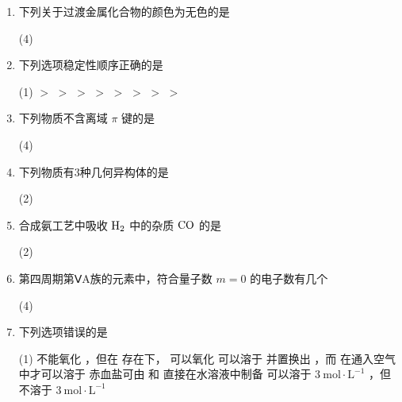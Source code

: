 \begin{enumerate}[label=\arabic*., itemsep=1.5ex]
    \item 下列关于过渡金属化合物的颜色为无色的是
    \begin{tasks}(4)
        \task {}
        \task {}
        \task {}
        \task {}
    \end{tasks}

    \item 下列选项稳定性顺序正确的是
    \begin{tasks}(1)
        \task {} $>$  $>$ 
        \task {} $>$  $>$ 
        \task {} $>$  $>$ \ce{[Fe(SCN)4]+}
        \task {} $>$  $>$ 
    \end{tasks}

    \item 下列物质不含离域 $\pi$ 键的是
    \begin{tasks}(4)
        \task {}
        \task {}
        \task {}
        \task {}
    \end{tasks}

    \item 下列物质有3种几何异构体的是
    \begin{tasks}(2)
        \task \ce{[Pt(NH3)2BrCl3]}
        \task \ce{[Co(NH3)2(en)Cl2]+}
        \task \ce{[PtCl2(NO2)2(NH3)2]}
        \task \ce{[Co(NH3)(en)Cl3]}
    \end{tasks}

    \item 合成氨工艺中吸收 $\ce{H2}$ 中的杂质 $\ce{CO}$ 的是
    \begin{tasks}(2)
        \task {}
        \task {}
        \task {}
        \task {}
    \end{tasks}

    \item 第四周期第ⅤA族的元素中，符合量子数 $m=0$ 的电子数有几个
    \begin{tasks}(4)
    \end{tasks}

    \item 下列选项错误的是
    \begin{tasks}(1)
        \task {} 不能氧化 ，但在  存在下， 可以氧化 
        \task {} 可以溶于  并置换出 ，而  在通入空气中才可以溶于 
        \task 赤血盐可由  和  直接在水溶液中制备
        \task {} 可以溶于 $3\ \mathrm{mol\cdot L^{-1}}$ ，但不溶于 $3\ \mathrm{mol\cdot L^{-1}}$ 
    \end{tasks}


\end{enumerate}
